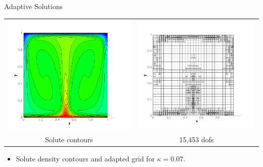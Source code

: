 \documentclass[compress,12pt]{beamer}
\begin{document}
\begin{frame}{Adaptive Solutions}
  {
    \begin{center}
      \begin{tabular}{cc} \\
	\includegraphics[width=.5\textwidth]{figures/s_adapt_kappa_0_07}&
	\includegraphics[width=.5\textwidth]{figures/grid_adapt_kappa_0_07}\\
	Solute contours &
	15,453 dofs
      \end{tabular}\end{center}
    \begin{itemize}
      
    \item Solute density contours and adapted grid for $\kappa=0.07$.
    \end{itemize}
  }


\end{frame}
\end{document}

